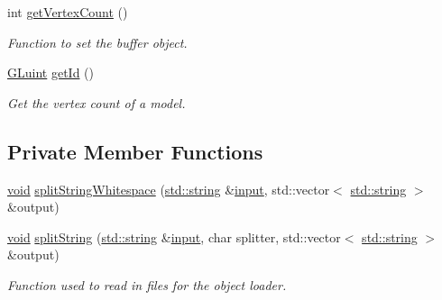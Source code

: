 \begin{DoxyCompactItemize}
int \mbox{\hyperlink{class_aspect_1_1_engine_1_1_vertex_array_a65dd6d4b63e56fa07470f56b21c2930c}{get\+Vertex\+Count}} ()
\begin{DoxyCompactList}\small\item\em Function to set the buffer object. \end{DoxyCompactList}\item 
\mbox{\hyperlink{glew_8h_a68c4714e43d8e827d80759f9cb864f3c}{G\+Luint}} \mbox{\hyperlink{class_aspect_1_1_engine_1_1_vertex_array_add09721b84713dd247942d1ddad3de80}{get\+Id}} ()
\begin{DoxyCompactList}\small\item\em Get the vertex count of a model. \end{DoxyCompactList}\end{DoxyCompactItemize}
\subsection*{Private Member Functions}
\begin{DoxyCompactItemize}
\item 
\mbox{\hyperlink{_s_d_l__opengles2__gl2ext_8h_ae5d8fa23ad07c48bb609509eae494c95}{void}} \mbox{\hyperlink{class_aspect_1_1_engine_1_1_vertex_array_aeea4f92339da156685950a8426ad59b6}{split\+String\+Whitespace}} (\mbox{\hyperlink{_s_d_l__opengl__glext_8h_ae84541b4f3d8e1ea24ec0f466a8c568b}{std\+::string}} \&\mbox{\hyperlink{_s_d_l__opengl__glext_8h_ad3c78daa7d8673f71649d4840c641779}{input}}, std\+::vector$<$ \mbox{\hyperlink{_s_d_l__opengl__glext_8h_ae84541b4f3d8e1ea24ec0f466a8c568b}{std\+::string}} $>$ \&output)
\item 
\mbox{\hyperlink{_s_d_l__opengles2__gl2ext_8h_ae5d8fa23ad07c48bb609509eae494c95}{void}} \mbox{\hyperlink{class_aspect_1_1_engine_1_1_vertex_array_a25294fe466043546f03876f169fd8740}{split\+String}} (\mbox{\hyperlink{_s_d_l__opengl__glext_8h_ae84541b4f3d8e1ea24ec0f466a8c568b}{std\+::string}} \&\mbox{\hyperlink{_s_d_l__opengl__glext_8h_ad3c78daa7d8673f71649d4840c641779}{input}}, char splitter, std\+::vector$<$ \mbox{\hyperlink{_s_d_l__opengl__glext_8h_ae84541b4f3d8e1ea24ec0f466a8c568b}{std\+::string}} $>$ \&output)
\begin{DoxyCompactList}\small\item\em Function used to read in files for the object loader. \end{DoxyCompactList}\end{DoxyCompactItemize}

